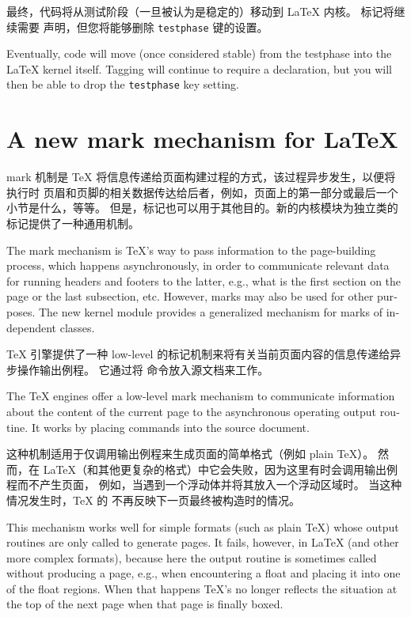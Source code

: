 \documentclass{ltnews}
\newcommand*\thbox{\texorpdfstring\hbox{}}
\def\LATEX{\LaTeX}
\begin{document}
最终，代码将从测试阶段（一旦被认为是稳定的）移动到 \LATEX{} 内核。
标记将继续需要  声明，但您将能够删除 \texttt{testphase} 键的设置。

\begin{english}
Eventually, code will move (once considered stable) from the
testphase into the \LaTeX{} kernel itself. Tagging will continue to
require a  declaration, but you will then be able
to drop the \texttt{testphase} key setting.
\end{english}


\section{\thbox{新的 mark 机制} A new mark mechanism for \LaTeX{}}

mark 机制是 TeX 将信息传递给页面构建过程的方式，该过程异步发生，以便将执行时
页眉和页脚的相关数据传达给后者，例如，页面上的第一部分或最后一个小节是什么，等等。
但是，标记也可以用于其他目的。新的内核模块为独立类的标记提供了一种通用机制。

\begin{english}
The mark mechanism is \TeX{}'s way to pass information to the
page-building process, which happens asynchronously, in order to
communicate relevant data for running headers and footers to the
latter, e.g., what is the first section on the page or the last
subsection, etc. However, marks may also be
used for other purposes. The new kernel module provides a generalized
mechanism for marks of independent classes.
\end{english}

\TeX{} 引擎提供了一种 low-level 的标记机制来将有关当前页面内容的信息传递给异步操作输出例程。
它通过将  命令放入源文档来工作。

\begin{english}
The \TeX{} engines offer a low-level mark mechanism to
communicate information about the content of the current page to
the asynchronous operating output routine. It works by placing
 commands into the source document.
\end{english}

这种机制适用于仅调用输出例程来生成页面的简单格式（例如 plain \TeX）。
然而，在 \LATEX （和其他更复杂的格式）中它会失败，因为这里有时会调用输出例程而不产生页面，
例如，当遇到一个浮动体并将其放入一个浮动区域时。
当这种情况发生时，\TeX{} 的  不再反映下一页最终被构造时的情况。

\begin{english}
This mechanism works well for simple formats (such as plain \TeX)
whose output routines are only called to generate pages. It
fails, however, in \LaTeX{} (and other more complex formats),
because here the output routine is sometimes called without
producing a page, e.g., when encountering a float and placing it
into one of the float regions.
%
When that happens \TeX{}'s   no
longer reflects the situation at the top of the next page when that
page is finally boxed.
\end{english}
\end{document}

